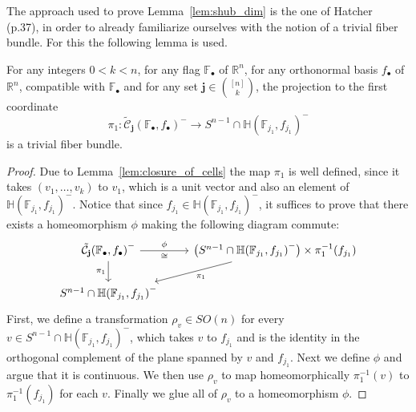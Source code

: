 The approach used to prove Lemma~\ref{lem:shub_dim} is the one of Hatcher~\cite{vec_bundles} (p.37), in order to already familiarize ourselves with the notion of a trivial fiber bundle. For this the following lemma is used.
\begin{lemma}\label{lem:trivial_fb} For any integers $0<k<n$, for any flag $\mathbb{F}_{\bullet}$ of $\mathbb{R}^n$, for any orthonormal basis $f_{\bullet}$ of $\mathbb{R}^n$, compatible with $\mathbb{F}_{\bullet}$ and for any set $\mathbf{j}\in\binom{[n]}{k}$, the projection to the first coordinate
\[\pi_1:\tilde{\mathcal{C}}_{\mathbf{j}}{\left(\mathbb{F}_{\bullet},f_{\bullet}\right)}^-\to S^{n-1}\cap\mathbb{H}{\left(\mathbb{F}_{j_1},f_{j_1}\right)}^-\]
is a trivial fiber bundle.
\end{lemma}
\begin{proof} Due to Lemma~\ref{lem:closure_of_cells} the map $\pi_1$ is well defined, since it takes $(v_1,\ldots,v_k)$ to $v_1$, which is a unit vector and also an element of $\mathbb{H}{\left(\mathbb{F}_{j_1},f_{j_1}\right)}^-$. Notice that since $f_{j_1}\in\mathbb{H}{\left(\mathbb{F}_{j_1},f_{j_1}\right)}^-$, it suffices to prove that there exists a homeomorphism $\phi$ making the following diagram commute:
\begin{equation}\label{eq:phi_for_trivial}
\begin{tikzcd}
\tilde{\mathcal{C}}_{\mathbf{j}}{\left(\mathbb{F}_{\bullet},f_{\bullet}\right)}^-\ar[r,"\phi","\cong"']\ar[d,"\pi_1"']&\big(S^{n-1}\cap\mathbb{H}{\left(\mathbb{F}_{j_1},f_{j_1}\right)}^-\big)\times\pi_1^{-1}(f_{j_1})\ar[dl,"\pi_1"]\\
S^{n-1}\cap\mathbb{H}{\left(\mathbb{F}_{j_1},f_{j_1}\right)}^-
\end{tikzcd}
\end{equation}
First, we define a transformation $\rho_{v}\in SO(n)$ for every $v\in S^{n-1}\cap\mathbb{H}{\left(\mathbb{F}_{j_1},f_{j_1}\right)}^-$, which takes $v$ to $f_{j_1}$ and is the identity in the orthogonal complement of the plane spanned by $v$ and $f_{j_1}$. Next we define $\phi$ and argue that it is continuous. We then use $\rho_{v}$ to map homeomorphically $\pi_1^{-1}(v)$ to $\pi_1^{-1}(f_{j_1})$ for each $v$. Finally we glue all of $\rho_v$ to a homeomorphism $\phi$.


\end{proof}
